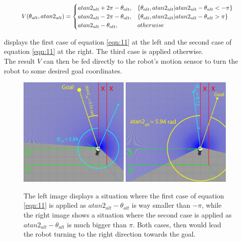 \begin{equation}
\label{eqn:11}
\resizebox{.90\textwidth}{!}{$\displaystyle
V(\theta_{alt},atan2_{alt}) =
\begin{cases}
atan2_{alt} + 2\pi - \theta_{alt}, &\{\theta_{alt},atan2_{alt}|atan2_{alt} - \theta_{alt} < -\pi \}\\
atan2_{alt} - 2\pi - \theta_{alt}, &\{\theta_{alt},atan2_{alt}|atan2_{alt} - \theta_{alt} > \pi\}\\
atan2_{alt} - \theta_{alt}, &{otherwise }
\end{cases}
$}
\end{equation}

 displays the first case of equation \ref{eqn:11} at the left and the second case of equation \ref{eqn:11} at the right. The third case is applied otherwise.\\

The result $ V $ can then be fed directly to the robot's motion sensor to turn the robot to some desired goal coordinates. 

\begin{figure}[h]%
\centering
\includegraphics[width=0.48\textwidth]{Bilder/move_to_goal_case_1.png} 
\hspace{0.2 cm}
\includegraphics[width=0.48\textwidth]{Bilder/move_to_goal_case_2.png} 
\caption[]{The left image displays a situation where the first case of equation \ref{eqn:11} is applied as $atan2_{alt} - \theta_{alt}$ is way smaller than $-\pi$, while the right image shows a situation where the second case is applied as $atan2_{alt} - \theta_{alt}$ is much bigger than $\pi$. Both cases, then would lead the robot turning to the right direction towards the goal.}
\label{move_to_goal}
\end{figure}

